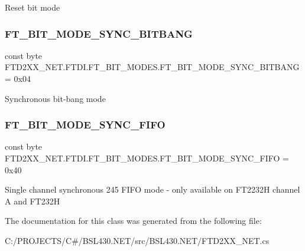 Reset bit mode 

\mbox{\label{class_f_t_d2_x_x___n_e_t_1_1_f_t_d_i_1_1_f_t___b_i_t___m_o_d_e_s_a71c1f579c745402b1c32fa8651374559}} 
\subsubsection{\texorpdfstring{FT\_BIT\_MODE\_SYNC\_BITBANG}{FT\_BIT\_MODE\_SYNC\_BITBANG}}
{\footnotesize\ttfamily const byte F\+T\+D2\+X\+X\+\_\+\+N\+E\+T.\+F\+T\+D\+I.\+F\+T\+\_\+\+B\+I\+T\+\_\+\+M\+O\+D\+E\+S.\+F\+T\+\_\+\+B\+I\+T\+\_\+\+M\+O\+D\+E\+\_\+\+S\+Y\+N\+C\+\_\+\+B\+I\+T\+B\+A\+NG = 0x04}



Synchronous bit-\/bang mode 

\mbox{\label{class_f_t_d2_x_x___n_e_t_1_1_f_t_d_i_1_1_f_t___b_i_t___m_o_d_e_s_a13e5f9775a32660f4f9bb39f5ded0b3c}} 
\subsubsection{\texorpdfstring{FT\_BIT\_MODE\_SYNC\_FIFO}{FT\_BIT\_MODE\_SYNC\_FIFO}}
{\footnotesize\ttfamily const byte F\+T\+D2\+X\+X\+\_\+\+N\+E\+T.\+F\+T\+D\+I.\+F\+T\+\_\+\+B\+I\+T\+\_\+\+M\+O\+D\+E\+S.\+F\+T\+\_\+\+B\+I\+T\+\_\+\+M\+O\+D\+E\+\_\+\+S\+Y\+N\+C\+\_\+\+F\+I\+FO = 0x40}



Single channel synchronous 245 F\+I\+FO mode -\/ only available on F\+T2232H channel A and F\+T232H 



The documentation for this class was generated from the following file\+:\begin{DoxyCompactItemize}
\item 
C\+:/\+P\+R\+O\+J\+E\+C\+T\+S/\+C\#/\+B\+S\+L430.\+N\+E\+T/src/\+B\+S\+L430.\+N\+E\+T/F\+T\+D2\+X\+X\+\_\+\+N\+E\+T.\+cs\end{DoxyCompactItemize}
